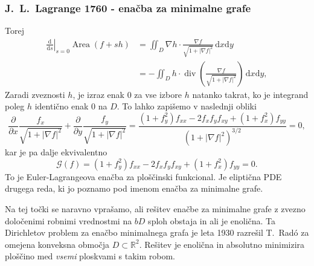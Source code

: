 \documentclass[8pt]{beamer}
\theoremstyle{definition}
\theoremstyle{remark}
\theoremstyle{plain}
\numberwithin{equation}{section}  %
\begin{document}
\begin{frame}
    \frametitle{J.~L.~Lagrange 1760 - enačba za minimalne grafe}

    Torej
    \begin{align*}
        \left.\frac{\mathrm{d}}{\mathrm{d} s}\right|_{s=0} \operatorname{Area}(f+s h) & =\iint_{D} \nabla h \cdot \frac{\nabla f}{\sqrt{1+|\nabla f|^2}} \, \mathrm{d} x \mathrm{d} y \\
        & =-\iint_{D}h \cdot \operatorname{div}\left(\frac{\nabla f}{\sqrt{1+|\nabla f|^2}}\right) \, \mathrm{d} x \mathrm{d} y,
    \end{align*}
    Zaradi zveznosti $h$, je izraz enak $0$ za vse izbore $h$ natanko takrat, ko je integrand poleg $h$ identično enak $0$ na $D$. To lahko zapišemo v naslednji obliki
    \begin{equation*}
        \frac{\partial}{\partial x} \frac{f_x}{\sqrt{1+|\nabla f|^2}}+\frac{\partial}{\partial y} \frac{f_y}{\sqrt{1+|\nabla f|^2}}=\frac{\left(1+f_y^2\right) f_{x x}-2 f_x f_y f_{x y}+\left(1+f_x^2\right) f_{y y}}{\left(1+|\nabla f|^2\right)^{3 / 2}}=0 , 
    \end{equation*}
    kar je pa dalje ekvivalentno
    \begin{equation*}
        \mathscr{G}(f)=\left(1+f_y^2\right) f_{x x}-2 f_x f_y f_{x y}+\left(1+f_x^2\right) f_{y y}=0 .
    \end{equation*}
    To je \textcolor{red1}{Euler-Lagrangeova enačba} za ploščinski funkcional. Je eliptična PDE drugega reda, ki jo poznamo pod imenom \textcolor{red1}{enačba za minimalne grafe}.
    
    \vspace{0.8em}
    
    Na tej točki se naravno vprašamo, ali rešitev enačbe za minimalne grafe z zvezno določenimi robnimi vrednostmi na $bD$ sploh obstaja in ali je enolična. Ta Dirichletov problem za enačbo minimalnega grafa je leta 1930 razrešil T.~Radó za omejena konveksna območja $D \subset \mathbb{R}^2$. Rešitev je enolična in absolutno minimizira ploščino med \emph{vsemi} ploskvami s takim robom.

\end{frame}
\end{document}
